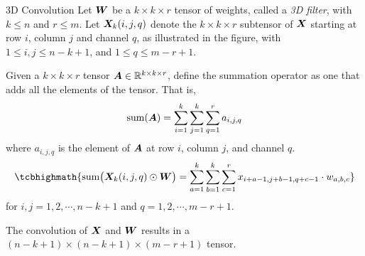 %
%
%
%
\begin{frame}{3D Convolution}
Let ${\boldsymbol W}$ be a $k \times k \times r$ tensor of weights, called a {\em 3D
filter}, with $k \le n$ and $r \le m$. 
Let ${\boldsymbol X}_k(i,j,q)$ denote the $k \times k \times r$ subtensor of ${\boldsymbol X}$ 
starting at row $i$, column
$j$ and channel $q$, as illustrated in the figure, %
with $1 \le i, j \le n-k+1$, and $1 \le q \le m-r+1$.

\medskip

Given a $k \times k \times r$ tensor ${\boldsymbol A} \in {\mathord{\mathbb R}}^{k \times k \times r}$, 
define the summation operator as one
that adds all the elements of the tensor. That is,
\begin{align*}
    \operatorname*{sum}({\boldsymbol A}) = \sum_{i=1}^k \sum_{j=1}^k \sum^{r}_{q=1} a_{i,j,q}
\end{align*}
where $a_{i,j,q}$ is the element of ${\boldsymbol A}$ at row $i$, column $j$, and
channel $q$.
\begin{align*}
    \tcbhighmath{
    \summ\bigl(\bX_k(i,j,q) \odot \bW\bigr) = \sum_{a=1}^k \sum_{b=1}^k \sum_{c=1}^r
x_{i+a-1, j+b-1, q+c-1} \cdot w_{a, b, c} }
\end{align*}
for $i, j = 1,2,\cdots,n-k+1$ and $q = 1,2,\cdots,m-r+1$.

\medskip

The convolution of ${\boldsymbol X}$ and
${\boldsymbol W}$ results in a $(n-k+1) \times
(n-k+1) \times (m-r+1)$ tensor.

\end{frame}

